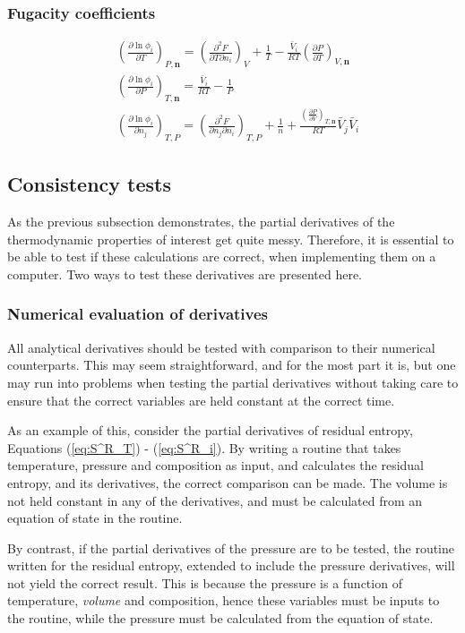 \documentclass[internal,english]{sintefmemo2012}
\numberwithin{equation}{section}
\newcommand*{\pder}[2]{\left(\frac{\partial #1}{\partial #2}\right)}
\newcommand*{\pdcross}[3]{\left(\frac{\partial^2 #1}{\partial #2 \partial #3}\right)}
\newcommand*{\reff}[1]{(\ref{#1})}
\begin{document}
\subsubsection*{Fugacity coefficients}
\begin{align}
\label{eq:lnphi_T}
& \pder{\ln \phi_i}{T}_{P, \textbf{n}} = \pdcross{F}{T}{n_i}_V + \frac{1}{T} - \frac{\bar{V}_i}{RT}  \pder{P}{T}_{V,\textbf{n}} \\
\label{eq:lnphi_P}
& \pder{\ln \phi_i}{P}_{T, \textbf{n}} = \frac{\bar{V}_i}{RT} - \frac{1}{P} \\
\label{eq:lnphi_i}
& \pder{\ln \phi_i}{n_j}_{T, P}  = \pdcross{F}{n_j}{n_i}_{T,P} + \frac{1}{n} + \frac{\pder{P}{V}_{T,\textbf{n}}}{RT} \bar{V}_j \bar{V}_i 
\end{align}

\subsection{Consistency tests}
\label{subsec:consistCheck}
As the previous subsection demonstrates, the partial derivatives of the thermodynamic properties of interest get quite messy. Therefore, it is essential to be able to test if these calculations are correct, when implementing them on a computer. Two ways to test these derivatives are presented here.

\subsubsection*{Numerical evaluation of derivatives}
All analytical derivatives should be tested with comparison to their numerical counterparts. This may seem straightforward, and for the most part it is, but one may run into problems when testing the partial derivatives without taking care to ensure that the correct variables are held constant at the correct time. 

As an example of this, consider the partial derivatives of residual entropy, Equations \reff{eq:S^R_T} - \reff{eq:S^R_i}. By writing a routine that takes temperature, pressure and composition as input, and calculates the residual entropy, and its derivatives, the correct comparison can be made. The volume is not held constant in any of the derivatives, and must be calculated from an equation of state in the routine.

By contrast, if the partial derivatives of the pressure are to be tested, the routine written for the residual entropy, extended to include the pressure derivatives, will not yield the correct result. This is because the pressure is a function of temperature, \textit{volume} and composition, hence these variables must be inputs to the routine, while the pressure must be calculated from the equation of state.
\end{document}
